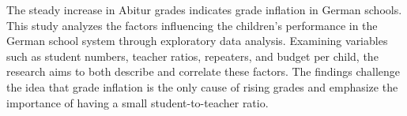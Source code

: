 

The steady increase in Abitur grades indicates grade inflation in German schools. This study analyzes the factors influencing the children's performance in the German school system through exploratory data analysis. Examining variables such as student numbers, teacher ratios, repeaters, and budget per child, the research aims to both describe and correlate these factors. The findings challenge the idea that grade inflation is the only cause of rising grades and emphasize the importance of having a small student-to-teacher ratio.